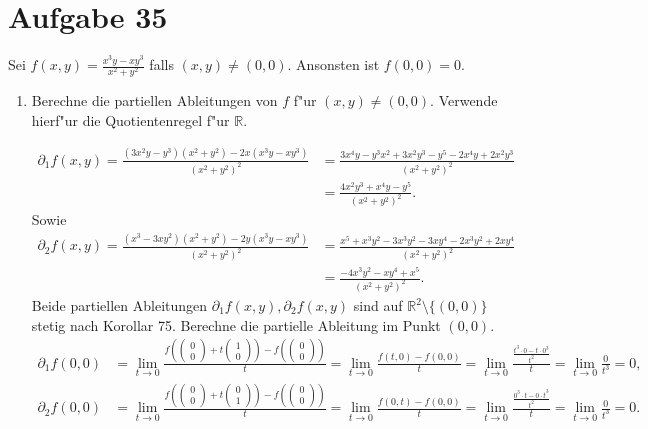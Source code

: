 \documentclass[a4paper, landscape,twocolumn,fontsize=8pt]{scrartcl}
\theoremstyle{plain}
\begin{document}
\section*{Aufgabe 35}
Sei $f(x,y) = \frac{x^3y-xy^3}{x^2+y^2}$ falls $(x,y) \neq (0,0)$. Ansonsten ist $f(0,0) = 0$.
\begin{enumerate}[label=(\roman*)]
    \item Berechne die partiellen Ableitungen von $f$ f"ur $(x,y) \neq (0,0)$. Verwende hierf"ur die Quotientenregel f"ur $\mathbb R$.
    
    \begin{align*}
        \partial_1f(x,y) = \frac{(3x^2y-y^3)(x^2+y^2) - 2x(x^3y-xy^3)}{(x^2+y^2)^2} &= \frac{3x^4y-y^3x^2+3x^2y^3-y^5-2x^4y+2x^2y^3}{(x^2+y^2)^2}\\
        &= \frac{4x^2y^3+x^4y-y^5}{(x^2+y^2)^2}.
    \end{align*}
    Sowie 
    \begin{align*}
        \partial_2f(x,y) = \frac{(x^3-3xy^2)(x^2+y^2)-2y(x^3y-xy^3)}{(x^2+y^2)^2} &= \frac{x^5+x^3y^2-3x^3y^2-3xy^4-2x^3y^2+2xy^4}{(x^2+y^2)^2}\\
        &= \frac{-4x^3y^2-xy^4+x^5}{(x^2+y^2)^2}.
    \end{align*}
    Beide partiellen Ableitungen $\partial_1f(x,y),\partial_2f(x,y)$ sind auf $\mathbb R^2 \setminus \{(0,0)\}$ stetig nach Korollar 75. Berechne die partielle Ableitung im Punkt $(0,0)$.
    \begin{align*}
        \partial_1f(0,0) &= \lim_{t \to 0} \frac{f(\begin{pmatrix}0\\0\end{pmatrix}+t\begin{pmatrix}1\\0\end{pmatrix}) - f(\begin{pmatrix}0\\0\end{pmatrix})}{t} = \lim_{t \to 0} \frac{f(t,0)-f(0,0)}{t} = \lim_{t \to 0} \frac{\frac{t^3\cdot0-t\cdot 0^3}{t^2}}{t} = \lim_{t \to 0} \frac{0}{t^3} = 0,\\
        \partial_2f(0,0) &= \lim_{t \to 0} \frac{f(\begin{pmatrix}0\\0\end{pmatrix}+t\begin{pmatrix}0\\1\end{pmatrix}) - f(\begin{pmatrix}0\\0\end{pmatrix})}{t} = \lim_{t \to 0} \frac{f(0,t)-f(0,0)}{t} = \lim_{t \to 0} \frac{\frac{0^3\cdot t-0\cdot t^3}{t^2}}{t} = \lim_{t \to 0} \frac{0}{t^3} = 0.

\end{align*}
\end{enumerate}
\end{document}
